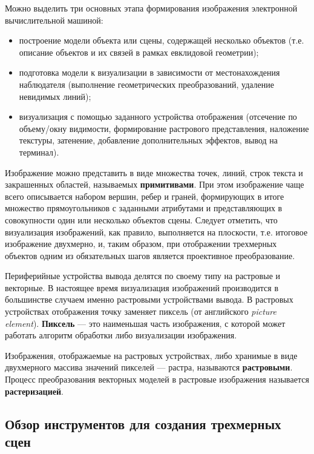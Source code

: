 Можно выделить три основных этапа формирования изображения электронной
вычислительной машиной:
\begin{itemize}
    \item построение модели объекта или сцены, содержащей несколько объектов
        (т\@.е\@. описание объектов и их связей в рамках евклидовой геометрии);
    \item подготовка модели к визуализации в зависимости от местонахождения
        наблюдателя (выполнение геометрических преобразований, удаление
        невидимых линий);
    \item визуализация с помощью заданного устройства отображения (отсечение по
        объему/окну видимости, формирование растрового представления, наложение
        текстуры, затенение, добавление дополнительных эффектов, вывод на
        терминал).
\end{itemize}

Изображение можно представить в виде множества точек, линий, строк текста и
закрашенных областей, называемых \textbf{примитивами}. При этом изображение чаще
всего описывается набором вершин, ребер и граней, формирующих в итоге множество
прямоугольников с заданными атрибутами и представляющих в совокупности один или
несколько объектов сцены. Следует отметить, что визуализация изображений, как
правило, выполняется на плоскости, т\@.е\@. итоговое изображение двухмерно, и,
таким образом, при отображении трехмерных объектов одним из обязательных шагов
является проективное преобразование.

Периферийные устройства вывода делятся по своему типу на растровые и векторные.
В настоящее время визуализация изображений производится в большинстве случаем
именно растровыми устройствами вывода. В растровых устройствах отображения точку
заменяет пиксель (от английского \textit{picture element}). \textbf{Пиксель} ---
это наименьшая часть изображения, с которой может работать алгоритм обработки
либо визуализации изображения.

Изображения, отображаемые на растровых устройствах, либо хранимые в виде
двухмерного массива значений пикселей --- растра, называются
\textbf{растровыми}. Процесс преобразования векторных моделей в растровые
изображения называется \textbf{растеризацией}.

\subsection{Обзор инструментов для создания трехмерных сцен}

